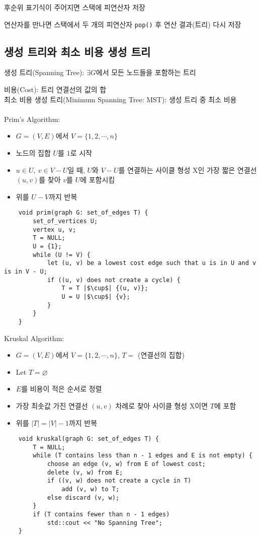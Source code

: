후순위 표기식이 주어지면 스택에 피연산자 저장

연산자를 만나면 스택에서 두 개의 피연산자 \texttt{pop()} 후 연산 결과(트리) 다시 저장

\subsection{생성 트리와 최소 비용 생성 트리}
생성 트리(Spanning Tree): $\exists G$에서 모든 노드들을 포함하는 트리

비용(Cost): 트리 연결선의 값의 합\\
최소 비용 생성 트리(Minimum Spanning Tree: MST): 생성 트리 중 최소 비용
\\\\
Prim's Algorithm:
\begin{itemize}
    \item $G = (V, E)$에서 $V = \{1, 2, \cdots, n\}$
    \item 노드의 집합 $U$를 $1$로 시작
    \item $u \in U,\ v \in V - U$일 때, $U$와 $V-U$를 연결하는 사이클 형성 X인 가장 짧은 연결선 $(u, v)$를 찾아 $v$를 $U$에 포함시킴
    \item 위를 $U-V$까지 반복
\end{itemize}
\begin{verbatim}
    void prim(graph G: set_of_edges T) {
        set_of_vertices U;
        vertex u, v;
        T = NULL;
        U = {1};
        while (U != V) {
            let (u, v) be a lowest cost edge such that u is in U and v is in V - U;
            if ((u, v) does not create a cycle) {
                T = T |$\cup$| {(u, v)};
                U = U |$\cup$| {v};
            }
        }
    }
\end{verbatim}
\phantom{}
\newpage
Kruskal Algorithm:
\begin{itemize}
    \item $G = (V, E)$에서 $V = \{1, 2, \cdots, n\}$, $T =$ (연결선의 집합)
    \item Let $T = \varnothing$
    \item $E$를 비용이 적은 순서로 정렬
    \item 가장 최솟값 가진 연결선 $(u, v)$ 차례로 찾아 사이클 형성 X이면 $T$에 포함
    \item 위를 $|T| = |V| - 1$까지 반복
\end{itemize}
\begin{verbatim}
    void kruskal(graph G: set_of_edges T) {
        T = NULL;
        while (T contains less than n - 1 edges and E is not empty) {
            choose an edge (v, w) from E of lowest cost;
            delete (v, w) from E;
            if ((v, w) does not create a cycle in T)
                add (v, w) to T;
            else discard (v, w);
        }
        if (T contains fewer than n - 1 edges)
            std::cout << "No Spanning Tree";
    }
\end{verbatim}

